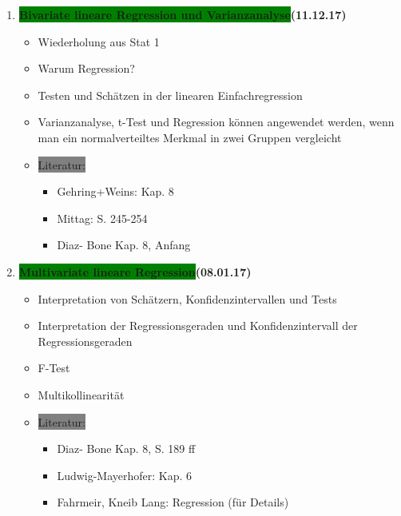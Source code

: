 \documentclass[a4paper,fontsize=16pt]{article}
\begin{document}
\begin{enumerate}
     
%     

  
   \item{\textbf{\colorbox{green}{Bivariate lineare Regression und Varianzanalyse}(11.12.17)}
     \begin{itemize}
          \item{Wiederholung aus Stat 1 } %
          \item{Warum Regression?}
          \item{Testen und Schätzen in der linearen Einfachregression}
          \item{Varianzanalyse, t-Test und Regression können angewendet werden,
          wenn man ein normalverteiltes Merkmal in zwei Gruppen vergleicht}
           \item{\colorbox{gray}{Literatur:} 
          \begin{itemize}
       \item{ Gehring+Weins: Kap. 8}
       \item{Mittag: S. 245-254}
       \item{Diaz- Bone Kap. 8, Anfang }
       \end{itemize}}
     \end{itemize}
   }
   
   \item{\textbf{\colorbox{green}{Multivariate lineare Regression}(08.01.17)}
     \begin{itemize}
          \item{Interpretation von Schätzern, Konfidenzintervallen und Tests}
          \item{Interpretation der Regressionsgeraden und Konfidenzintervall der Regressionsgeraden}
          \item{F-Test}
          \item{Multikollinearität}
          \item{\colorbox{gray}{Literatur:} 
          \begin{itemize}
       \item{Diaz- Bone Kap. 8, S. 189 ff }
       \item{Ludwig-Mayerhofer: Kap. 6}
       \item{Fahrmeir, Kneib Lang: Regression (für Details)}
       \end{itemize}}
     \end{itemize}
   }
   

\end{enumerate}
\end{document}
